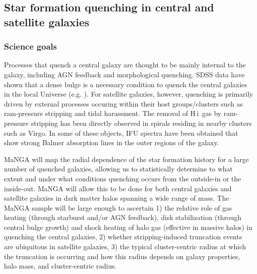 \documentclass[preprint,11pt]{aastex}
\newcommand{\HI}{{\sc H\,i}}
\begin{document}

\subsection{Star formation quenching in central and satellite galaxies}
\label{sec:high-density}

\subsubsection{Science goals}

Processes that quench a central galaxy are thought to be mainly
internal to the galaxy, including AGN feedback and morphological
quenching.  SDSS data have shown that a dense bulge is a necessary
condition to quench the central galaxies in the local Universe
(e.g. \citealt{fang2013}).  For satellite galaxies, however, quenching
is primarily driven by external processes occuring within their host
groups/clusters such as ram-pressure stripping and tidal
harassment. The removal of \HI\ gas by ram-pressure stripping has been
directly observed in spirals residing in nearby clusters such as
Virgo. In some of these objects, IFU spectra have been obtained that
show strong Balmer absorption lines in the outer regions of the
galaxy.

MaNGA will map the radial dependence of the star formation history for
a large number of quenched galaxies, allowing us to statistically
determine to what extent and under what conditions quenching occurs
from the outside-in or the inside-out. MaNGA will allow this to be
done for both central galaxies and satellite galaxies in dark matter
halos spanning a wide range of mass. The MaNGA sample will be large
enough to ascertain 1) the relative role of gas heating (through
starburst and/or AGN feedback), disk stabilization (through central
bulge growth) and shock heating of halo gas (effective in massive
halos) in quenching the central galaxies, 2) whether stripping-induced
truncation events are ubiquitous in satellite galaxies, 3) the typical
cluster-centric radius at which the truncation is occurring and how
this radius depends on galaxy properties, halo mass, and
cluster-centric radius.
\end{document}
